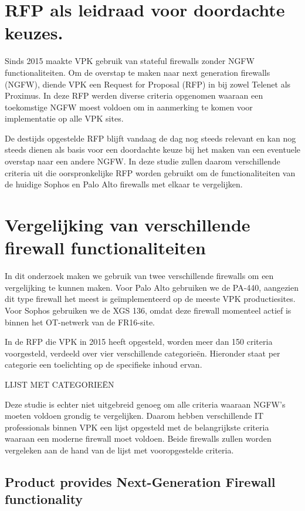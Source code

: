 \section{RFP als leidraad voor doordachte keuzes.}
Sinds 2015 maakte VPK gebruik van stateful firewalls zonder NGFW functionaliteiten. Om de overstap te maken naar next generation firewalls (NGFW), diende VPK een Request for Proposal (RFP) in bij zowel Telenet als Proximus. In deze RFP werden diverse criteria opgenomen waaraan een toekomstige NGFW moest voldoen om in aanmerking te komen voor implementatie op alle VPK sites.

De destijds opgestelde RFP blijft vandaag de dag nog steeds relevant en kan nog steeds dienen als basis voor een doordachte keuze bij het maken van een eventuele overstap naar een andere NGFW. In deze studie zullen daarom verschillende criteria uit die oorspronkelijke RFP worden gebruikt om de functionaliteiten van de huidige Sophos en Palo Alto firewalls met elkaar te vergelijken.




\section{Vergelijking van verschillende firewall functionaliteiten}
In dit onderzoek maken we gebruik van twee verschillende firewalls om een vergelijking te kunnen maken. Voor Palo Alto gebruiken we de PA-440, aangezien dit type firewall het meest is geïmplementeerd op de meeste VPK productiesites. Voor Sophos gebruiken we de XGS 136, omdat deze firewall momenteel actief is binnen het OT-netwerk van de FR16-site.

In de RFP die VPK in 2015 heeft opgesteld, worden meer dan 150 criteria voorgesteld, verdeeld over vier verschillende categorieën. Hieronder staat per categorie een toelichting op de specifieke inhoud ervan.

LIJST MET CATEGORIEËN

Deze studie is echter niet uitgebreid genoeg om alle criteria waaraan NGFW’s moeten voldoen grondig te vergelijken. Daarom hebben verschillende IT professionals binnen VPK een lijst opgesteld met de belangrijkste criteria waaraan een moderne firewall moet voldoen. Beide firewalls zullen worden vergeleken aan de hand van de lijst met vooropgestelde criteria.




\subsection{Product provides Next-Generation Firewall functionality}


